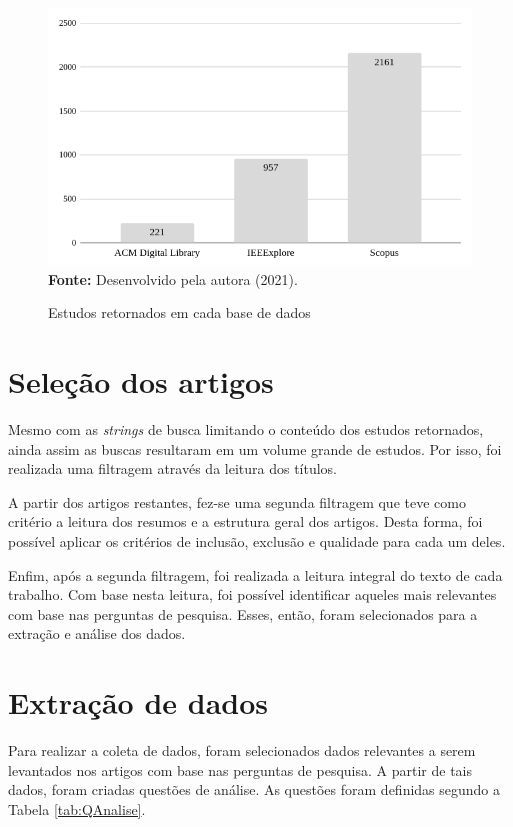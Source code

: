 \documentclass[
    12pt,       %
    openright,      %
    twoside,      %
    a4paper,      %
    english,      %
    french,       %
    spanish,      %
    brazil,       %
    ]{abntex2}
\begin{document}
\begin{figure}[h]
    \centering
    \caption{Estudos retornados em cada base de dados}
    \includegraphics[scale=0.55]{src/tex/img/graficoBuscas.png} \\
    \label{EstudosRetornados}
    \textbf{Fonte:} Desenvolvido pela autora (2021).
    \centering
\end{figure}

\section{Seleção dos artigos}

Mesmo com as \textit{strings} de busca limitando o conteúdo dos estudos retornados, ainda assim as buscas resultaram em um volume grande de estudos. Por isso, foi realizada uma filtragem através da leitura dos títulos.

A partir dos artigos restantes, fez-se uma segunda filtragem que teve como critério a leitura dos resumos e a estrutura geral dos artigos. Desta forma, foi possível aplicar os critérios de inclusão, exclusão e qualidade para cada um deles. 

Enfim, após a segunda filtragem, foi realizada a leitura integral do texto de cada trabalho. Com base nesta leitura, foi possível identificar aqueles mais relevantes com base nas perguntas de pesquisa. Esses, então, foram selecionados para a extração e análise dos dados.

\section{Extração de dados}

Para realizar a coleta de dados, foram selecionados dados relevantes a serem levantados nos artigos com base nas perguntas de pesquisa. A partir de tais dados, foram criadas questões de análise. As questões foram definidas segundo a Tabela \ref{tab:QAnalise}.
\end{document}
